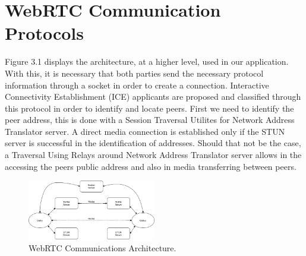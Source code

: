 \section{WebRTC Communication Protocols}
Figure 3.1 displays the architecture, at a higher level, used in our application. With this, it is necessary that both parties send the necessary protocol information through a socket in order to create a connection. Interactive Connectivity Establishment (ICE) applicants are proposed and classified through this protocol in order to identify and locate peers. First we need to identify the peer address, this is done with a Session Traversal Utilites for Network Address Translator server. A direct media connection is established only if the STUN server is successful in the identification of addresses. Should that not be the case, a Traversal Using Relays around Network Address Translator server allows in the accessing the peers public address and also in media transferring between peers.

\begin{figure}[h!]
    \caption{WebRTC Communications Architecture.}
    \label{image:webRTCCommsArch}
    \centering
    \includegraphics[width=0.5\textwidth]{images/WebRTCCommsArchitecture.png}
\end{figure}

